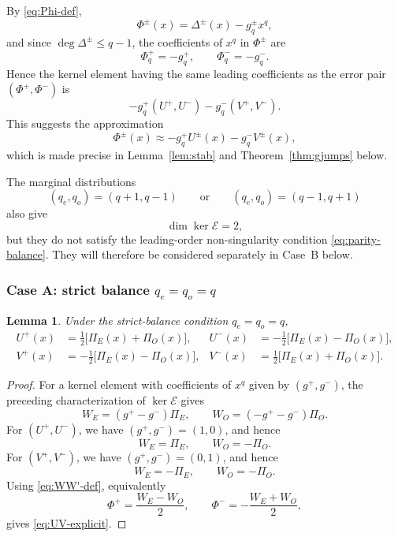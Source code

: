 \documentclass[11pt,a4paper]{article}
\newtheorem{lemma}[theorem]{Lemma}
\theoremstyle{definition}
\begin{document}
By \eqref{eq:Phi-def},
\[
\Phi^\pm(x)
=
\Delta^\pm(x)-g_q^\pm x^q,
\]
and since \(\deg\Delta^\pm\leq q-1\), the coefficients of \(x^q\) in
\(\Phi^\pm\) are
\[
\Phi_q^+=-g_q^+,
\qquad
\Phi_q^-=-g_q^-.
\]
Hence the kernel element having the same leading coefficients as the
error pair \((\Phi^+,\Phi^-)\) is
\[
-g_q^+(U^+,U^-)-g_q^-(V^+,V^-).
\]
This suggests the approximation
\[
\Phi^\pm(x)
\approx
-g_q^+U^\pm(x)-g_q^-V^\pm(x),
\]
which is made precise in Lemma~\ref{lem:stab} and
Theorem~\ref{thm:gjumps} below.

The marginal distributions
\[
(q_e,q_o)=(q+1,q-1)
\qquad\text{or}\qquad
(q_e,q_o)=(q-1,q+1)
\]
also give
\[
\dim\ker\mathcal E=2,
\]
but they do not satisfy the leading-order non-singularity condition
\eqref{eq:parity-balance}. They will therefore be considered
separately in Case~B below.



\subsubsection*{Case A: strict balance \(q_e=q_o=q\)}

\begin{lemma}\label{lem:UV-balanced}
Under the strict-balance condition \(q_e=q_o=q\),
\begin{equation}\label{eq:UV-explicit}
\begin{aligned}
U^+(x)
&=
\frac{1}{2}\bigl[\Pi_E(x)+\Pi_O(x)\bigr],
&
U^-(x)
&=
-\frac{1}{2}\bigl[\Pi_E(x)-\Pi_O(x)\bigr],
\\[2pt]
V^+(x)
&=
-\frac{1}{2}\bigl[\Pi_E(x)-\Pi_O(x)\bigr],
&
V^-(x)
&=
\frac{1}{2}\bigl[\Pi_E(x)+\Pi_O(x)\bigr].
\end{aligned}
\end{equation}
\end{lemma}

\begin{proof}
For a kernel element with coefficients of \(x^q\) given by
\((g^+,g^-)\), the preceding characterization of
\(\ker\mathcal E\) gives
\[
W_E=(g^+-g^-)\Pi_E,
\qquad
W_O=(-g^+-g^-)\Pi_O.
\]
For \((U^+,U^-)\), we have \((g^+,g^-)=(1,0)\), and hence
\[
W_E=\Pi_E,
\qquad
W_O=-\Pi_O.
\]
For \((V^+,V^-)\), we have \((g^+,g^-)=(0,1)\), and hence
\[
W_E=-\Pi_E,
\qquad
W_O=-\Pi_O.
\]
Using \eqref{eq:WW'-def}, equivalently
\[
\Phi^+=\frac{W_E-W_O}{2},
\qquad
\Phi^-=-\frac{W_E+W_O}{2},
\]
gives \eqref{eq:UV-explicit}.
\end{proof}
\end{document}
